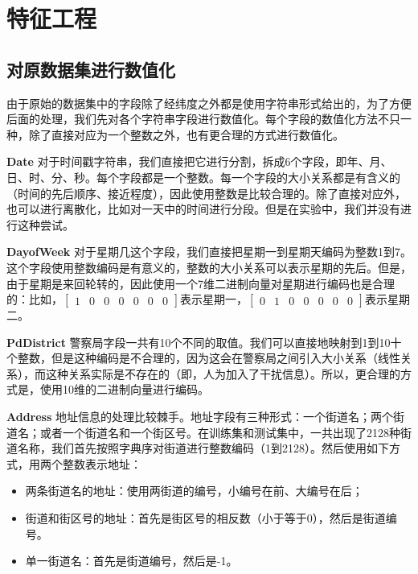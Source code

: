 \section{特征工程}
\label{sec:feature}

\subsection{对原数据集进行数值化}
\label{subsec:feature0}

由于原始的数据集中的字段除了经纬度之外都是使用字符串形式给出的，为了方便后面的处理，我们先对各个字符串字段进行数值化。每个字段的数值化方法不只一种，除了直接对应为一个整数之外，也有更合理的方式进行数值化。

\textbf{Date} 对于时间戳字符串，我们直接把它进行分割，拆成6个字段，即年、月、日、时、分、秒。每个字段都是一个整数。每一个字段的大小关系都是有含义的（时间的先后顺序、接近程度），因此使用整数是比较合理的。除了直接对应外，也可以进行离散化，比如对一天中的时间进行分段。但是在实验中，我们并没有进行这种尝试。

\textbf{DayofWeek} 对于星期几这个字段，我们直接把星期一到星期天编码为整数1到7。这个字段使用整数编码是有意义的，整数的大小关系可以表示星期的先后。但是，由于星期是来回轮转的，因此使用一个7维二进制向量对星期进行编码也是合理的：比如，$[\begin{array}{ccccccc}1&0&0&0&0&0&0\end{array}]$表示星期一，$[\begin{array}{ccccccc}0&1&0&0&0&0&0\end{array}]$表示星期二。

\textbf{PdDistrict} 警察局字段一共有10个不同的取值。我们可以直接地映射到1到10十个整数，但是这种编码是不合理的，因为这会在警察局之间引入大小关系（线性关系），而这种关系实际是不存在的（即，人为加入了干扰信息）。所以，更合理的方式是，使用10维的二进制向量进行编码。

\textbf{Address} 地址信息的处理比较棘手。地址字段有三种形式：一个街道名；两个街道名；或者一个街道名和一个街区号。在训练集和测试集中，一共出现了2128种街道名称，我们首先按照字典序对街道进行整数编码（1到2128）。然后使用如下方式，用两个整数表示地址：

\begin{itemize}
    \item 两条街道名的地址：使用两街道的编号，小编号在前、大编号在后；
    \item 街道和街区号的地址：首先是街区号的相反数（小于等于0），然后是街道编号。
    \item 单一街道名：首先是街道编号，然后是-1。
\end{itemize}

